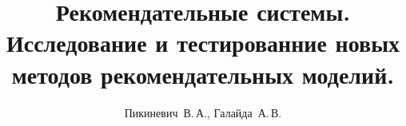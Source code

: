 \documentclass[12pt,twoside]{article}
\title
    [Рекомендательные системы]
    {Рекомендательные системы. Исследование и тестированние новых методов рекомендательных моделий.}
\author
    [Пикиневич~В.\,А.]
    {Пикиневич~В.\,А., Галайда~А.\,В.}
\begin{document}
\maketitle
\bigskip
\bigskip
\bigskip
\bigskip
\bigskip
\maketitleSecondary
\end{document}
